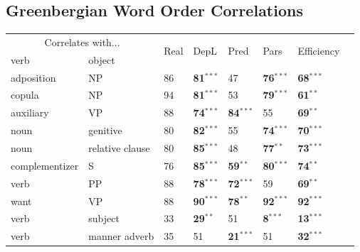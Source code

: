 \documentclass[9pt,twocolumn,twoside,lineno]{pnas-new}
\begin{document}
\subsection{Greenbergian Word Order Correlations}
\label{sec:greenberg}
\begin{table}
	\begin{center}
\begin{tabular}{|ll|l|l|l|ll|l|}
	\hline
	\multicolumn{2}{|c|}{Correlates with...}   &         \multirow{2}{*}{Real}   & \multirow{2}{*}{DepL}  & \multirow{2}{*}{Pred}   &  \multirow{2}{*}{Pars} &  \multirow{2}{*}{Efficiency}  \\ 
	verb & object     & & & &  & \\ \hline \hline %
adposition    &    NP       &    86    &    \textbf{81}$^{***}$    &    47    &    \textbf{76}$^{***}$    &    \textbf{68}$^{***}$   \\
copula    &    NP        &    94    &    \textbf{81}$^{***}$    &    53    &    \textbf{79}$^{***}$    &    \textbf{61}$^{**}$   \\
auxiliary    &    VP       &    88    &    \textbf{74}$^{***}$    &    \textbf{84}$^{***}$    &    55    &    \textbf{69}$^{**}$   \\
noun    &    genitive      &    80    &    \textbf{82}$^{***}$    &    55    &    \textbf{74}$^{***}$    &    \textbf{70}$^{***}$   \\
noun    &    relative clause       &    80    &    \textbf{85}$^{***}$    &    48    &    \textbf{77}$^{**}$    &    \textbf{73}$^{***}$   \\
complementizer    &    S        &    76    &    \textbf{85}$^{***}$    &    \textbf{59}$^{**}$    &    \textbf{80}$^{***}$    &    \textbf{74}$^{**}$   \\
verb    &    PP     &    88    &    \textbf{78}$^{***}$    &    \textbf{72}$^{***}$    &    59    &    \textbf{69}$^{**}$   \\
want    &    VP      &    88    &    \textbf{90}$^{***}$    &    \textbf{78}$^{**}$    &    \textbf{92}$^{***}$    &    \textbf{92}$^{***}$   \\
verb    &    subject    &    33    &    \textbf{29}$^{**}$    &    51    &    \textbf{8}$^{***}$    &    \textbf{13}$^{***}$   \\
verb    &    manner adverb     &    35    &    51    &    \textbf{21}$^{***}$    &    51    &    \textbf{32}$^{***}$   \\
 \hline

\end{tabular}
\end{center}
\end{table}
\end{document}
